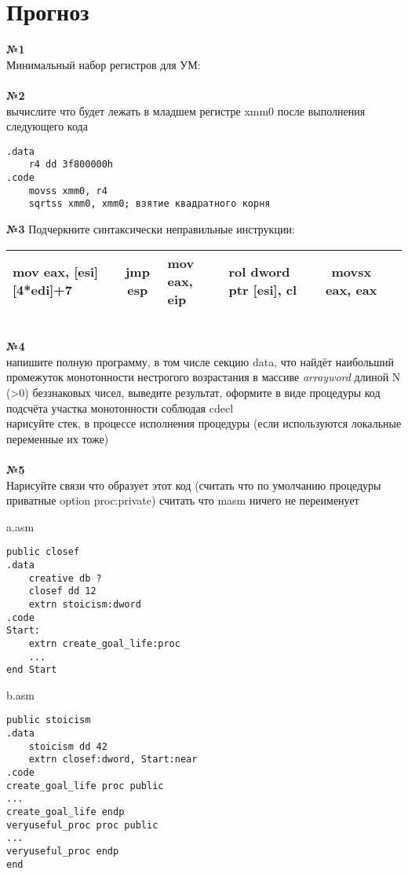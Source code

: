 \documentclass[a4paper,10pt]{article}
\begin{document}
\section*{Прогноз}
\textbf{№1} \\
Минимальный набор регистров для УМ: \\
\vspace{0.3cm} \\
\textbf{№2} \\
вычислите что будет лежать в младшем регистре xmm0 после выполнения следующего кода
\begin{verbatim}
.data
    r4 dd 3f800000h
.code
    movss xmm0, r4
    sqrtss xmm0, xmm0; взятие квадратного корня
\end{verbatim}
\vspace{0.3cm}
\textbf{№3}
Подчеркните синтаксически неправильные инструкции: \\
\begin{tabularx}{\textwidth}{|X|c|X|X|c|c|}
    \hline
    mov eax, [esi][4*edi]+7 & jmp esp & mov eax, eip & rol dword ptr [esi], cl & movsx eax, eax\\
    \hline
\end{tabularx}
\vspace{0.2cm} \\
\textbf{№4} \\
напишите полную программу, в том числе секцию data, что найдёт наибольший промежуток монотонности нестрогого возрастания в массиве \textit{arrayword} длиной N (>0)  беззнаковых чисел, выведите результат, оформите в виде процедуры код подсчёта участка монотонности соблюдая cdecl\\
нарисуйте стек, в процессе исполнения процедуры (если используются локальные переменные их тоже) \\
\vspace{0.3cm} \\
\textbf{№5} \\
Нарисуйте связи что образует этот код (считать что по умолчанию процедуры приватные option proc:private) считать что masm ничего не переименует
\begin{multicols}{2}
a.asm
\begin{verbatim}
public closef
.data
    creative db ?
    closef dd 12
    extrn stoicism:dword
.code
Start:
    extrn create_goal_life:proc
    ...
end Start
\end{verbatim}
\columnbreak
b.asm
\begin{verbatim}
public stoicism
.data
    stoicism dd 42
    extrn closef:dword, Start:near
.code
create_goal_life proc public
...
create_goal_life endp
veryuseful_proc proc public
...
veryuseful_proc endp
end
\end{verbatim}
\end{multicols}
\end{document}
